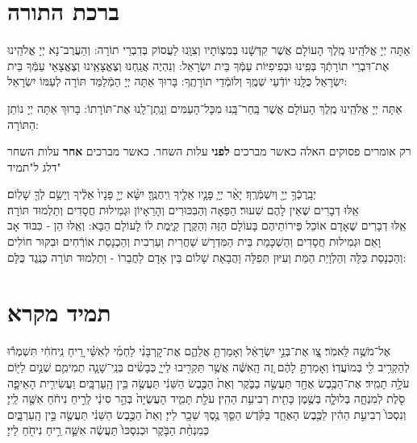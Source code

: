 \section[ברכת התורה]{ברכת התורה}

אַתָּה יְיָ אֱלֹהֵֽינוּ מֶֽלֶךְ הָעוֹלָם אֲשֶׁר קִדְּשָֽֿׁנוּ בְּמִצְוֹתָיו וְצִוָּֽנוּ לַעֲסוֹק בְּדִבְרֵי תוֹרָה: וְהַעֲרֶב־נָא יְיָ אֱלֹהֵֽינוּ אֶת־דִּבְרֵי תוֹרָתְֿךָ בְּפִֽינוּ וּבְפִיפִיּוֹת עַמְּֿךָ בֵּית יִשְׂרָאֵל: וְנִהְיֶה אֲנַֽחְנוּ וְצֶאֱצָאֵֽינוּ וְצֶאֱצָאֵי עַמְּֿךָ בֵּית יִשְׂרָאֵל כֻּלָּֽנוּ יוֹדְֿעֵי שְׁמֶֽךָ וְלוֹמְֿדֵי תוֹרָתֶֽךָ: בָּרוּךְ אַתָּה יְיָ הַמְֿלַמֵּד תּוֹרָה לְעַמּוֹ יִשְׂרָאֵל:
 
אַתָּה יְיָ אֱלֹהֵֽינוּ מֶֽלֶךְ הָעוֹלָם אֲשֶׁר בָּֽחַר־בָּֽנוּ מִכָּל־הָעַמִּים וְנָֽתַן־לָֽנוּ אֶת־תּוֹרָתוֹ: בָּרוּךְ אַתָּה יְיָ נוֹתֵן הַתּוֹרָה:

\begin{sometimes}

\begin{scriptsize}
\textsf{
רק אומרים פסוקים האלה כאשר מברכים \textbf{לפני} עלות השחר.
כאשר מברכים \textbf{אחר} עלות השחר דלג ל"תמיד"}

\end{scriptsize}

יְבָֽרֶכְֿךָ֥ יְיָ֖ וְיִשְׁמְֿרֶֽךָ׃ יָאֵ֨ר יְיָ֧ פָּנָ֛יו אֵלֶ֖יךָ וִֽיחֻנֶּֽךָּ׃ יִשָּׂ֨א יְיָ֤ פָּנָיו֙ אֵלֶ֔יךָ וְיָשֵׂ֥ם לְךָ֖ שָׁלֽוֹם׃\\
אֵֽלּוּ דְבָרִים שֶׁאֵין לָהֶם שִׁעוּר׃ הַפֵּאָה וְהַבִּכּוּרִים וְהָרֵאָיוֹן וּגְמִילוּת חֲסָדִים וְתַלְמוּד תּוֹרָה׃\\
אֵֽלּוּ דְבָרִים שֶׁאָדָם אוֹכֵל פֵּירוֹתֵיהֶם בָּעוֹלָם הַזֶּה וְהַקֶּֽרֶן קַיֶּֽמֶת לוֹ לָעוֹלָם הַבָּא: וְאֵֽלּוּ הֵן - כִּבּוּד אָב וָאֵם וּגְמִילוּת חֲסָדִים וְהַשְׁכָּמַת בֵּית הַמִּדְרָשׁ שַׁחֲרִית וְעַרְבִית וְהַכְנָסַת אוֹרְֿחִים וּבִקּוּר חוֹלִים וְהַכְנָסַת כַּלָּה וְהַלְוָיַת הַמֵּת וְעִיּוּן תְּפִלָּה וַהֲבָאַת שָׁלוֹם בֵּין אָדָם לַחֲבֵרוֹ - וְתַלְמוּד תּוֹרָה כְּנֶֽגֶד כֻּלָּם:

\end{sometimes}

\section{תמיד \quad \textendash \quad מקרא}

אֶל־מֹשֶׁ֥ה לֵּאמֹֽר׃ 
צַ֚ו אֶת־בְּנֵ֣י יִשְׂרָאֵ֔ל וְאָמַרְתָּ֖ אֲלֵהֶ֑ם אֶת־קׇרְבָּנִ֨י לַחְמִ֜י לְאִשַּׁ֗י רֵ֚יחַ נִֽיחֹחִ֔י תִּשְׁמְר֕וּ לְהַקְרִ֥יב לִ֖י בְּמוֹעֲדֽוֹ׃ 
וְאָמַרְתָּ֣ לָהֶ֔ם זֶ֚ה הָֽאִשֶּׁ֔ה אֲשֶׁ֥ר תַּקְרִ֖יבוּ לַייָ֑ כְּבָשִׂ֨ים בְּנֵֽי־שָׁנָ֧ה תְמִימִ֛ם שְׁנַ֥יִם לַיּ֖וֹם עֹלָ֥ה תָמִֽיד׃ 
אֶת־הַכֶּ֥בֶשׂ אֶחָ֖ד תַּעֲשֶׂ֣ה בַבֹּ֑קֶר וְאֵת֙ הַכֶּ֣בֶשׂ הַשֵּׁנִ֔י תַּעֲשֶׂ֖ה בֵּ֥ין הָֽעַרְבָּֽיִם׃ 
וַעֲשִׂירִ֧ית הָאֵיפָ֛ה סֹ֖לֶת לְמִנְחָ֑ה בְּלוּלָ֛ה בְּשֶׁ֥מֶן כָּתִ֖ית רְבִיעִ֥ת הַהִֽין׃ 
עֹלַ֖ת תָּמִ֑יד הָעֲשֻׂיָה֙ בְּהַ֣ר סִינַ֔י לְרֵ֣יחַ נִיחֹ֔חַ אִשֶּׁ֖ה לַֽייָ׃ 
וְנִסְכּוֹ֙ רְבִיעִ֣ת הַהִ֔ין לַכֶּ֖בֶשׂ הָאֶחָ֑ד בַּקֹּ֗דֶשׁ הַסֵּ֛ךְ נֶ֥סֶךְ שֵׁכָ֖ר לַייָ׃ 
וְאֵת֙ הַכֶּ֣בֶשׂ הַשֵּׁנִ֔י תַּעֲשֶׂ֖ה בֵּ֣ין הָֽעַרְבָּ֑יִם כְּמִנְחַ֨ת הַבֹּ֤קֶר וּכְנִסְכּוֹ֙ תַּעֲשֶׂ֔ה אִשֵּׁ֛ה רֵ֥יחַ נִיחֹ֖חַ לַייָ׃ 
 

